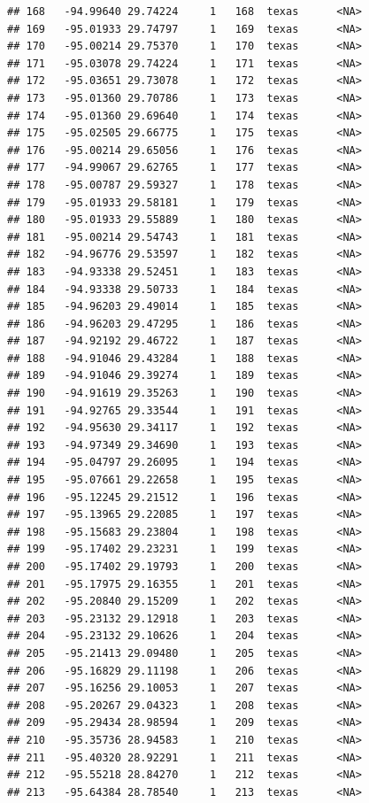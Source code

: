 \documentclass[
]{article}
\begin{document}
\begin{verbatim}
## 168   -94.99640 29.74224     1   168  texas      <NA>
## 169   -95.01933 29.74797     1   169  texas      <NA>
## 170   -95.00214 29.75370     1   170  texas      <NA>
## 171   -95.03078 29.74224     1   171  texas      <NA>
## 172   -95.03651 29.73078     1   172  texas      <NA>
## 173   -95.01360 29.70786     1   173  texas      <NA>
## 174   -95.01360 29.69640     1   174  texas      <NA>
## 175   -95.02505 29.66775     1   175  texas      <NA>
## 176   -95.00214 29.65056     1   176  texas      <NA>
## 177   -94.99067 29.62765     1   177  texas      <NA>
## 178   -95.00787 29.59327     1   178  texas      <NA>
## 179   -95.01933 29.58181     1   179  texas      <NA>
## 180   -95.01933 29.55889     1   180  texas      <NA>
## 181   -95.00214 29.54743     1   181  texas      <NA>
## 182   -94.96776 29.53597     1   182  texas      <NA>
## 183   -94.93338 29.52451     1   183  texas      <NA>
## 184   -94.93338 29.50733     1   184  texas      <NA>
## 185   -94.96203 29.49014     1   185  texas      <NA>
## 186   -94.96203 29.47295     1   186  texas      <NA>
## 187   -94.92192 29.46722     1   187  texas      <NA>
## 188   -94.91046 29.43284     1   188  texas      <NA>
## 189   -94.91046 29.39274     1   189  texas      <NA>
## 190   -94.91619 29.35263     1   190  texas      <NA>
## 191   -94.92765 29.33544     1   191  texas      <NA>
## 192   -94.95630 29.34117     1   192  texas      <NA>
## 193   -94.97349 29.34690     1   193  texas      <NA>
## 194   -95.04797 29.26095     1   194  texas      <NA>
## 195   -95.07661 29.22658     1   195  texas      <NA>
## 196   -95.12245 29.21512     1   196  texas      <NA>
## 197   -95.13965 29.22085     1   197  texas      <NA>
## 198   -95.15683 29.23804     1   198  texas      <NA>
## 199   -95.17402 29.23231     1   199  texas      <NA>
## 200   -95.17402 29.19793     1   200  texas      <NA>
## 201   -95.17975 29.16355     1   201  texas      <NA>
## 202   -95.20840 29.15209     1   202  texas      <NA>
## 203   -95.23132 29.12918     1   203  texas      <NA>
## 204   -95.23132 29.10626     1   204  texas      <NA>
## 205   -95.21413 29.09480     1   205  texas      <NA>
## 206   -95.16829 29.11198     1   206  texas      <NA>
## 207   -95.16256 29.10053     1   207  texas      <NA>
## 208   -95.20267 29.04323     1   208  texas      <NA>
## 209   -95.29434 28.98594     1   209  texas      <NA>
## 210   -95.35736 28.94583     1   210  texas      <NA>
## 211   -95.40320 28.92291     1   211  texas      <NA>
## 212   -95.55218 28.84270     1   212  texas      <NA>
## 213   -95.64384 28.78540     1   213  texas      <NA>

\end{verbatim}
\end{document}
